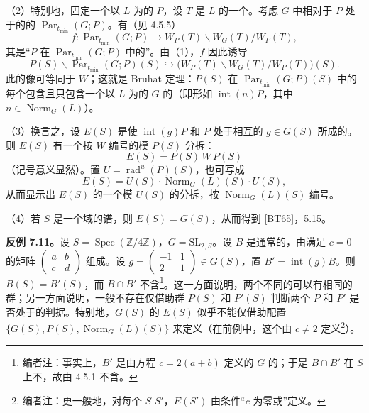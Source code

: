 （2）特别地，固定一个以 $L$ 为的 $P$，设 $T$ 是 $L$ 的一个。考虑 $G$ 中相对于 $P$ 处于的的 $\operatorname{Par}_{t_{\min}}(G;P)$。有（见 4.5.5）
\[
 f:\operatorname{Par}_{t_{\min}}(G;P)\longrightarrow W_P(T)\backslash W_G(T)/W_P(T),
\]
其是“$P$ 在 $\operatorname{Par}_{t_{\min}}(G;P)$ 中的”。由（1），$f$ 因此诱导
\[
 P(S)\backslash\operatorname{Par}_{t_{\min}}(G;P)(S)
 \hookrightarrow\bigl(W_P(T)\backslash W_G(T)/W_P(T)\bigr)(S).
\]
此的像可等同于 $W$；这就是 Bruhat 定理：$P(S)$ 在 $\operatorname{Par}_{t_{\min}}(G;P)(S)$ 中的每个包含且只包含一个以 $L$ 为的 $G$ 的（即形如 $\operatorname{int}(n)P$，其中 $n\in\operatorname{Norm}_G(L)$）。

（3）换言之，设 $E(S)$ 是使 $\operatorname{int}(g)P$ 和 $P$ 处于相互的 $g\in G(S)$ 所成的。则 $E(S)$ 有一个按 $W$ 编号的模 $P(S)$ 分拆：
\[
 E(S)=P(S)\,W\,P(S)
\]
（记号意义显然）。置 $U=\operatorname{rad}^{u}(P)(S)$，也可写成
\[
 E(S)=U(S)\cdot\operatorname{Norm}_G(L)(S)\cdot U(S),
\]
从而显示出 $E(S)$ 的一个模 $U(S)$ 的分拆，按 $\operatorname{Norm}_G(L)(S)$ 编号。

（4）若 $S$ 是一个域的谱，则 $E(S)=G(S)$，从而得到 [BT65]，5.15。

\textbf{反例 7.11。}设 $S=\operatorname{Spec}(\mathbb Z/4\mathbb Z)$，$G=\mathrm{SL}_{2,S}$。设 $B$ 是通常的，由满足 $c=0$ 的矩阵 $\left(\begin{smallmatrix}a&b\\c&d\end{smallmatrix}\right)$ 组成。设 $g=\left(\begin{smallmatrix}-1&1\\2&1\end{smallmatrix}\right)\in G(S)$，置 $B'=\operatorname{int}(g)B$。则 $B(S)=B'(S)$，而 $B\cap B'$ 不含\footnote{编者注：事实上，$B'$ 是由方程 $c=2(a+b)$ 定义的 $G$ 的；于是 $B\cap B'$ 在 $S$ 上不，故由 4.5.1 不含。}。这一方面说明，两个不同的可以有相同的群；另一方面说明，一般不存在仅借助群 $P(S)$ 和 $P'(S)$ 判断两个 $P$ 和 $P'$ 是否处于的判据。特别地，$G(S)$ 的 $E(S)$ 似乎不能仅借助配置 $\{G(S),P(S),\operatorname{Norm}_G(L)(S)\}$ 来定义（在前例中，这个由 $c\neq2$ 定义\footnote{编者注：更一般地，对每个 $S$  $S'$，$E(S')$ 由条件“$c$ 为零或”定义。}）。

